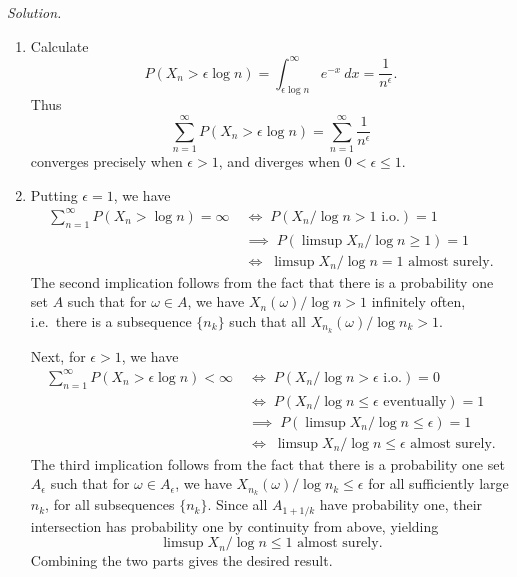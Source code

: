 \documentclass[10pt]{article}
\newcounter{prob}
\newcommand{\solution}{\textit{Solution.} }
\newcommand{\io}{\text{ i.o.}}
\begin{document}
    \solution \begin{enumerate}
        \item Calculate \[
            P(X_n > \epsilon \log{n}) = \int_{\epsilon\log{n}}^\infty e^{-x}\:dx =
            \frac{1}{n^\epsilon}.
        \] Thus \[
            \sum_{n = 1}^\infty P(X_n > \epsilon \log{n}) = \sum_{n = 1}^\infty
            \frac{1}{n^\epsilon}
        \] converges precisely when $\epsilon > 1$, and diverges when $0 < \epsilon
        \leq 1$.

        \item Putting $\epsilon = 1$, we have \begin{align*}
            \sum_{n = 1}^\infty P(X_n > \log{n}) = \infty
            \;&\iff\; P(X_n / \log{n} > 1 \io) = 1 \tag{Borel-Cantelli} \\
            \;&\implies\; P(\limsup X_n/\log{n} \geq 1) = 1 \\
            \;&\iff\; \limsup X_n/\log{n} = 1 \text{ almost surely}.
        \end{align*}
        The second implication follows from the fact that there is a probability one
        set $A$ such that for $\omega \in A$, we have $X_n(\omega) / \log{n} > 1$
        infinitely often, i.e.\ there is a subsequence $\{n_k\}$ such that all
        $X_{n_k}(\omega) / \log{n_k} > 1$.

        Next, for $\epsilon > 1$, we have \begin{align*}
            \sum_{n = 1}^\infty P(X_n > \epsilon\log{n}) < \infty
            \;&\iff\; P(X_n / \log{n} > \epsilon \io) = 0 \tag{Borel-Cantelli} \\
            \;&\iff\; P(X_n / \log{n} \leq \epsilon \text{ eventually}) = 1 \\
            \;&\implies\; P(\limsup X_n/\log{n} \leq \epsilon) = 1 \\
            \;&\iff\; \limsup X_n/\log{n} \leq \epsilon \text{ almost surely}.
        \end{align*}
        The third implication follows from the fact that there is a probability one
        set $A_\epsilon$ such that for $\omega \in A_\epsilon$, we have
        $X_{n_k}(\omega) / \log{n_k} \leq \epsilon$ for all sufficiently large $n_k$,
        for all subsequences $\{n_k\}$. Since all $A_{1 + 1/k}$ have probability one,
        their intersection has probability one by continuity from above, yielding
        \[
            \limsup X_n/\log{n} \leq 1 \text{ almost surely}.
        \] Combining the two parts gives the desired result.


\end{enumerate}
\end{document}
